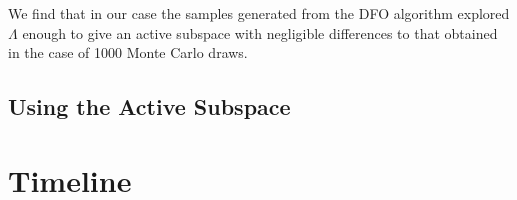 \documentclass{amsart}
\begin{document}
We find that in our case the samples generated from the DFO algorithm explored $\Lambda$ enough to give an active subspace with negligible differences to that obtained in the case of 1000 Monte Carlo draws.

\subsection{Using the Active Subspace}










\section{Timeline}










\end{document}
